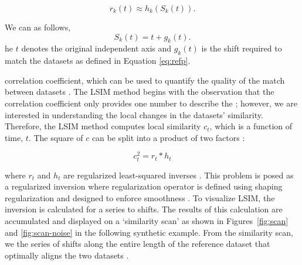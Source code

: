 \begin{equation} \label{eq:refp}
r_k(t) \approx h_k(S_k(t)).
\end{equation}

We can  as follows,
\begin{equation}\label{eq:shiftsp}
S_k(t) = t + g_k(t).
\end{equation}
he $t$ denotes the original independent axis and $g_k(t)$ is the shift required to match the datasets as defined in Equation \ref{eq:refp}.

 correlation coefficient, which can be used to quantify the quality of the match between datasets \cite[]{hrs1999}. The LSIM method begins with the observation that the correlation coefficient only provides one number to describe the ; however, we are interested in understanding the local changes in the datasets' similarity. Therefore, the LSIM method computes local similarity $c_t$, which is a function of time, $t$. The square of $c$ can be split into a product of two factors \cite[]{fomel2007local}:

\begin{equation}
c_t^2 = r_t*h_t 
\end{equation}

where $r_t$ and $h_t$ are regularized least-squared inverses . This problem is posed as a regularized inversion where regularization operator is defined using shaping regularization and designed to enforce smoothness \cite[]{fomel2007shaping}. To visualize LSIM, the inversion is calculated for a series to shifts. The results of this calculation are accumulated and displayed on a `similarity scan' as shown in Figures~\ref{fig:scan} and \ref{fig:scan-noise} in the following synthetic example. From the similarity scan, we  the series of shifts along the entire length of the reference dataset that optimally aligns the two datasets \cite[]{fomel2009time}.

